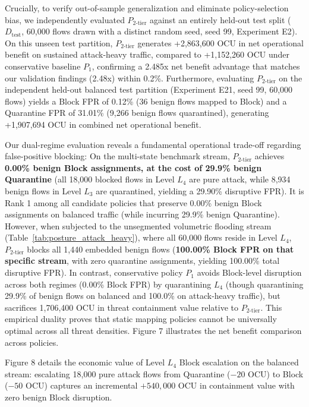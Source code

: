 \documentclass[journal,10pt,onecolumn]{IEEEtran}
\begin{document}
Crucially, to verify out-of-sample generalization and eliminate policy-selection bias, we independently evaluated $P_{2\text{-tier}}$ against an entirely held-out test split ($D_{\text{test}}$, 60,000 flows drawn with a distinct random seed, seed 99, Experiment E2). On this unseen test partition, $P_{2\text{-tier}}$ generates +2,863,600 OCU in net operational benefit on sustained attack-heavy traffic, compared to +1,152,260 OCU under conservative baseline $P_1$, confirming a 2.485x net benefit advantage that matches our validation findings (2.48x) within 0.2\%. Furthermore, evaluating $P_{2\text{-tier}}$ on the independent held-out balanced test partition (Experiment E21, seed 99, 60,000 flows) yields a Block FPR of 0.12\% (36 benign flows mapped to Block) and a Quarantine FPR of 31.01\% (9,266 benign flows quarantined), generating +1,907,694 OCU in combined net operational benefit.

Our dual-regime evaluation reveals a fundamental operational trade-off regarding false-positive blocking:
On the multi-state benchmark stream, $P_{2\text{-tier}}$ achieves \textbf{0.00\% benign Block assignments, at the cost of 29.9\% benign Quarantine} (all 18,000 blocked flows in Level $L_4$ are pure attack, while 8,934 benign flows in Level $L_3$ are quarantined, yielding a 29.90\% disruptive FPR). It is Rank 1 among all candidate policies that preserve 0.00\% benign Block assignments on balanced traffic (while incurring 29.9\% benign Quarantine). However, when subjected to the unsegmented volumetric flooding stream (Table~\ref{tab:posture_attack_heavy}), where all 60,000 flows reside in Level $L_4$, $P_{2\text{-tier}}$ blocks all 1,440 embedded benign flows (\textbf{100.00\% Block FPR on that specific stream}, with zero quarantine assignments, yielding 100.00\% total disruptive FPR). In contrast, conservative policy $P_1$ avoids Block-level disruption across both regimes (0.00\% Block FPR) by quarantining $L_4$ (though quarantining 29.9\% of benign flows on balanced and 100.0\% on attack-heavy traffic), but sacrifices 1,706,400 OCU in threat containment value relative to $P_{2\text{-tier}}$. This empirical duality proves that static mapping policies cannot be universally optimal across all threat densities. Figure 7 illustrates the net benefit comparison across policies.

Figure 8 details the economic value of Level $L_4$ Block escalation on the balanced stream: escalating 18,000 pure attack flows from Quarantine ($-20$ OCU) to Block ($-50$ OCU) captures an incremental $+540,000$ OCU in containment value with zero benign Block disruption.
\end{document}
